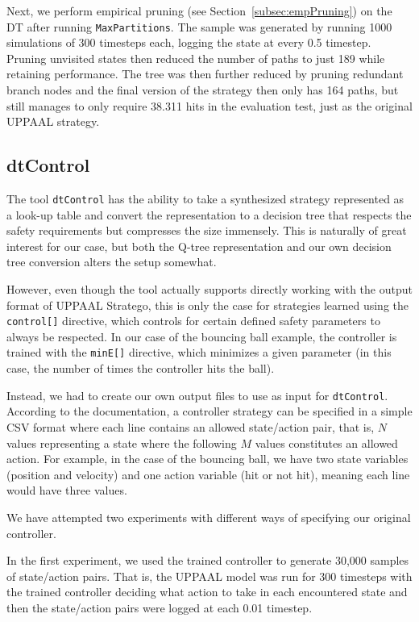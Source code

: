\documentclass{article}
\begin{document}
Next, we perform empirical pruning (see Section~\ref{subsec:empPruning}) on the
DT after running \texttt{MaxPartitions}. The sample was generated by running
1000 simulations of 300 timesteps each, logging the state at every 0.5 timestep.
Pruning unvisited states then reduced the number of paths to just 189 while
retaining performance.  The tree was then further reduced by pruning redundant
branch nodes and the final version of the strategy then only has 164 paths, but
still manages to only require 38.311 hits in the evaluation test, just as the
original UPPAAL strategy.


\subsection{dtControl}%
\label{subsec:dtControl}

The tool \texttt{dtControl} has the ability to take a synthesized strategy
represented as a look-up table and convert the representation to a decision
tree that respects the safety requirements but compresses the size immensely.
This is naturally of great interest for our case, but both the Q-tree
representation and our own decision tree conversion alters the setup somewhat.

However, even though the tool actually supports directly working with the output
format of UPPAAL Stratego, this is only the case for strategies learned using
the \texttt{control[]} directive, which controls for certain defined safety
parameters to always be respected. In our case of the bouncing ball example, the
controller is trained with the \texttt{minE[]} directive, which minimizes a
given parameter (in this case, the number of times the controller hits the
ball).

Instead, we had to create our own output files to use as input for
\texttt{dtControl}. According to the documentation, a controller strategy can be
specified in a simple CSV format where each line contains an allowed
state/action pair, that is, $N$ values representing a state where the following
$M$ values constitutes an allowed action. For example, in the case of the
bouncing ball, we have two state variables (position and velocity) and one action
variable (hit or not hit), meaning each line would have three values.

We have attempted two experiments with different ways of specifying our original
controller.

In the first experiment, we used the trained controller to generate 30,000
samples of state/action pairs. That is, the UPPAAL model was run for 300
timesteps with the trained controller deciding what action to take in each
encountered state and then the state/action pairs were logged at each 0.01
timestep.
\end{document}
